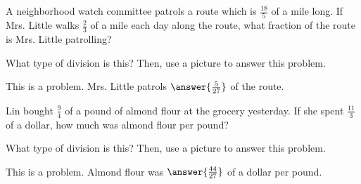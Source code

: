 \documentclass[nooutcomes]{ximera}
\begin{document}
\begin{problem}
A neighborhood watch committee patrols a route which is $\frac{18}{5}$ of a mile long.  If Mrs. Little walks $\frac{2}{3}$ of a mile each day along the route, what fraction of the route is Mrs. Little patrolling?

What type of division is this?  Then, use a picture to answer this problem.

\begin{prompt}
	This is a  problem.  Mrs. Little patrols $\answer{\frac{5}{27}}$ of the route.
\end{prompt}
\end{problem}



\begin{problem}
Lin bought $\frac{9}{4}$ of a pound of almond flour at the grocery yesterday.  If she spent $\frac{11}{3}$ of a dollar, how much was almond flour per pound?

What type of division is this?  Then, use a picture to answer this problem.

\begin{prompt}
This is a  problem.  Almond flour was $\answer{\frac{44}{27}}$ of a dollar per pound.
\end{prompt}

\end{problem}
\end{document}
